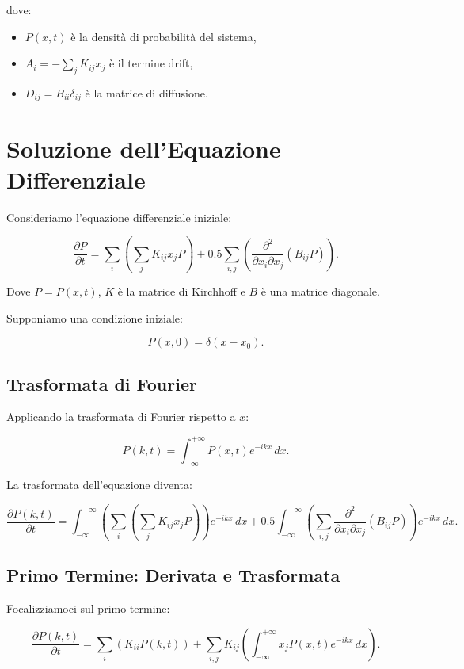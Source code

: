 \documentclass[Lau,binding=0.6cm,oneside,noexaminfo]{sapthesis}
\begin{document}
dove:
\begin{itemize}
    \item \( P(x,t) \) è la densità di probabilità del sistema,
    \item \( A_i = -\sum_j K_{ij} x_j \) è il termine drift,
    \item \( D_{ij} = B_{ii} \delta_{ij} \) è la matrice di diffusione.
\end{itemize}





\section*{Soluzione dell'Equazione Differenziale}

Consideriamo l'equazione differenziale iniziale:

\[
\frac{\partial P}{\partial t} = \sum_i \left( \sum_j K_{ij} x_j P \right) + 0.5 \sum_{i,j} \left( \frac{\partial^2}{\partial x_i \partial x_j} (B_{ij} P) \right).
\]

Dove \( P = P(x, t) \), \( K \) è la matrice di Kirchhoff e \( B \) è una matrice diagonale.

Supponiamo una condizione iniziale:

\[
P(x, 0) = \delta(x - x_0).
\]

\subsection*{Trasformata di Fourier}

Applicando la trasformata di Fourier rispetto a \( x \):

\[
P(k, t) = \int_{-\infty}^{+\infty} P(x, t) e^{-ikx} \, dx.
\]

La trasformata dell'equazione diventa:

\[
\frac{\partial P(k, t)}{\partial t} = \int_{-\infty}^{+\infty} \left( \sum_i \left( \sum_j K_{ij} x_j P \right) \right) e^{-ikx} \, dx + 0.5 \int_{-\infty}^{+\infty} \left( \sum_{i,j} \frac{\partial^2}{\partial x_i \partial x_j} (B_{ij} P) \right) e^{-ikx} \, dx.
\]

\subsection*{Primo Termine: Derivata e Trasformata}

Focalizziamoci sul primo termine:

\[
\frac{\partial P(k, t)}{\partial t} = \sum_i \left( K_{ii} P(k, t) \right) + \sum_{i,j} K_{ij} \left( \int_{-\infty}^{+\infty} x_j P(x, t) e^{-ikx} \, dx \right).
\]
\end{document}
